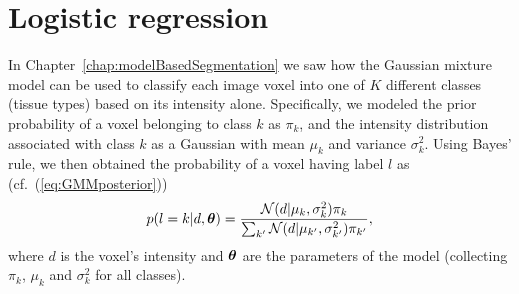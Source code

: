 \documentclass[10pt,twoside]{book}
\begin{document}
\section{Logistic regression}
\label{sec:logisticRegression}

In Chapter~\ref{chap:modelBasedSegmentation} we saw how the Gaussian mixture model can be used to classify each image voxel into one of $K$ different classes (tissue types) based on its intensity alone. Specifically, we modeled the prior probability of a  voxel belonging to class 
$k$
as 
$\pi_k$, 
and the intensity distribution associated with class $k$ as a Gaussian with mean $\mu_k$ and variance $\sigma_k^2$.
Using Bayes' rule, we then 
obtained the 
probability
of a voxel having label $l$ 
as
(cf.~(\eqref{eq:GMMposterior}))
\begin{equation}
  p( l = k | d, \bldgr{\theta} ) = \frac{ \N( d | \mu_k, \sigma_k^2 ) \pi_k }%
                                              { \sum_{k'} \N( d | \mu_{k'}, \sigma_{k'}^2 ) \pi_{k'} },  
\end{equation}
where 
$d$ is the voxel's intensity and 
${\mbox{\boldmath {${\theta}$}}}$ are the parameters of the model (collecting $\pi_k$, $\mu_k$ and $\sigma_k^2$ for all classes).
\end{document}
